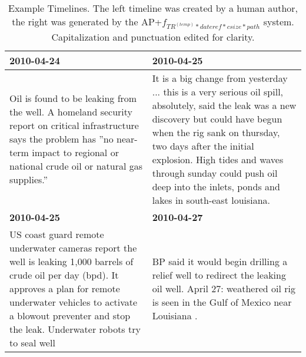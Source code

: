 \documentclass[a4paper,BCOR=10mm]{report}
\numberwithin{lemma}{chapter}
\numberwithin{definition}{chapter}
\begin{document}
\begin{table}
\begin{tabularx}{1.2\textwidth}{|X|X|}
\textbf{2010-04-24} & \textbf{2010-04-25} \\\hline
Oil is found to be leaking from the well. \newline A homeland security report on critical infrastructure says the problem has ''no near-term impact to regional or national crude oil or natural gas supplies.'' & It is a big change from yesterday ... this is a very serious oil spill, absolutely, said the leak was a new discovery but could have begun when the rig sank on thursday, two days after the initial explosion. \newline High tides and waves through sunday could push oil deep into the inlets, ponds and lakes in south-east louisiana. \\\hline
\textbf{2010-04-25} & \textbf{2010-04-27} \\\hline
US coast guard remote underwater cameras report the well is leaking 1,000 barrels of crude oil per day (bpd). \newline It approves a plan for remote underwater vehicles to activate a blowout preventer and stop the leak. \newline Underwater robots try to seal well & BP said it would begin drilling a relief well to redirect the leaking oil well. \newline April 27: weathered oil rig is seen in the Gulf of Mexico near Louisiana . \\\hline
\end{tabularx}
\caption{Example Timelines. The left timeline was created by a human author, the right was generated by the AP+$f_{TR^{(temp)} * dateref * csize * path}$ system. Capitalization and punctuation edited for clarity.}
\label{tab:tlbp}
\end{table}
\end{document}
